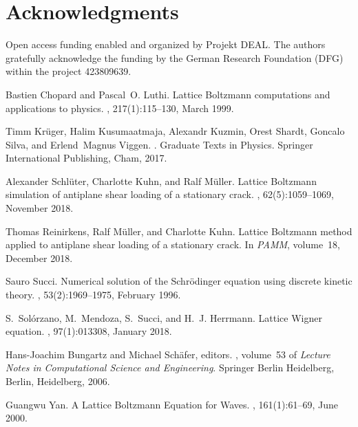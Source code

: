 \documentclass{article}
\begin{document}
\section*{Acknowledgments}
Open access funding enabled and organized by Projekt DEAL.
The authors gratefully acknowledge the funding by the German Research Foundation (DFG) within the project 423809639.


  
%  
\begin{thebibliography}{10}

Bastien Chopard and Pascal~O. Luthi.
\newblock Lattice {Boltzmann} computations and applications to physics.
, 217(1):115--130, March 1999.

Timm Krüger, Halim Kusumaatmaja, Alexandr Kuzmin, Orest Shardt, Goncalo Silva,
  and Erlend~Magnus Viggen.
.
\newblock Graduate {Texts} in {Physics}. Springer International Publishing,
  Cham, 2017.

Alexander Schlüter, Charlotte Kuhn, and Ralf Müller.
\newblock Lattice {Boltzmann} simulation of antiplane shear loading of a
  stationary crack.
, 62(5):1059--1069, November 2018.

Thomas Reinirkens, Ralf Müller, and Charlotte Kuhn.
\newblock Lattice {Boltzmann} method applied to antiplane shear loading of a
  stationary crack.
\newblock In {\em {PAMM}}, volume~18, December 2018.

Sauro Succi.
\newblock Numerical solution of the {Schrödinger} equation using discrete
  kinetic theory.
, 53(2):1969--1975, February 1996.

S.~Solórzano, M.~Mendoza, S.~Succi, and H.~J. Herrmann.
\newblock Lattice {Wigner} equation.
, 97(1):013308, January 2018.

Hans-Joachim Bungartz and Michael Schäfer, editors.
, volume~53 of {\em Lecture
  {Notes} in {Computational} {Science} and {Engineering}}.
\newblock Springer Berlin Heidelberg, Berlin, Heidelberg, 2006.

Guangwu Yan.
\newblock A {Lattice} {Boltzmann} {Equation} for {Waves}.
, 161(1):61--69, June 2000.


\end{thebibliography}
\end{document}
